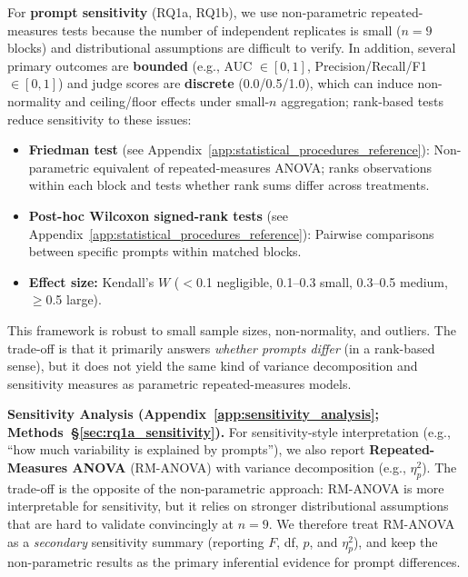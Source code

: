 For \textbf{prompt sensitivity} (RQ1a, RQ1b), we use non-parametric repeated-measures tests because the number of independent replicates is small ($n=9$ blocks) and distributional assumptions are difficult to verify. In addition, several primary outcomes are \textbf{bounded} (e.g., AUC $\in[0,1]$, Precision/Recall/F1 $\in[0,1]$) and judge scores are \textbf{discrete} (0.0/0.5/1.0), which can induce non-normality and ceiling/floor effects under small-$n$ aggregation; rank-based tests reduce sensitivity to these issues:
\begin{itemize}[noitemsep]
    \item \textbf{Friedman test} (see Appendix~\ref{app:statistical_procedures_reference}): Non-parametric equivalent of repeated-measures ANOVA; ranks observations within each block and tests whether rank sums differ across treatments.
    \item \textbf{Post-hoc Wilcoxon signed-rank tests} (see Appendix~\ref{app:statistical_procedures_reference}): Pairwise comparisons between specific prompts within matched blocks.
    \item \textbf{Effect size:} Kendall's $W$ ($<$0.1 negligible, 0.1--0.3 small, 0.3--0.5 medium, $\geq$0.5 large).
\end{itemize}

This framework is robust to small sample sizes, non-normality, and outliers. The trade-off is that it primarily answers \textit{whether prompts differ} (in a rank-based sense), but it does not yield the same kind of variance decomposition and sensitivity measures as parametric repeated-measures models.

\textbf{Sensitivity Analysis (Appendix~\ref{app:sensitivity_analysis}; Methods~\S\ref{sec:rq1a_sensitivity}).} For sensitivity-style interpretation (e.g., ``how much variability is explained by prompts''), we also report \textbf{Repeated-Measures ANOVA} (RM-ANOVA) with variance decomposition (e.g., $\eta^2_p$). The trade-off is the opposite of the non-parametric approach: RM-ANOVA is more interpretable for sensitivity, but it relies on stronger distributional assumptions that are hard to validate convincingly at $n=9$. We therefore treat RM-ANOVA as a \textit{secondary} sensitivity summary (reporting $F$, df, $p$, and $\eta^2_p$), and keep the non-parametric results as the primary inferential evidence for prompt differences.

